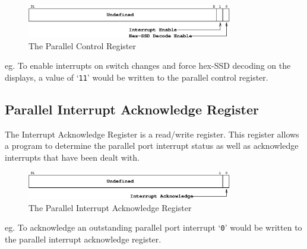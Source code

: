 \documentclass[a4paper,10pt]{article}
\begin{document}
\begin{figure}[h]
\begin{center}
\includegraphics[width=0.8\textwidth]{parallel_cr.eps}
\caption{The Parallel Control Register}
\label{parallel_cr_pic}
\end{center}
\end{figure}

eg. To enable interrupts on switch changes and force hex-SSD decoding
on the displays, a value of `\texttt{11}' would be written to
the parallel control register.

\subsection{Parallel Interrupt Acknowledge Register}

The Interrupt Acknowledge Register is a read/write register. This
register allows a program to determine the parallel port interrupt
status as well as acknowledge interrupts that have been dealt with.

\begin{figure}[h]
\begin{center}
\includegraphics[width=0.8\textwidth]{parallel_iack.eps}
\caption{The Parallel Interrupt Acknowledge Register}
\label{parallel_iack_pic}
\end{center}
\end{figure}

eg. To acknowledge an outstanding parallel port interrupt `\texttt{0}'
would be written to the parallel interrupt acknowledge register.
\end{document}
